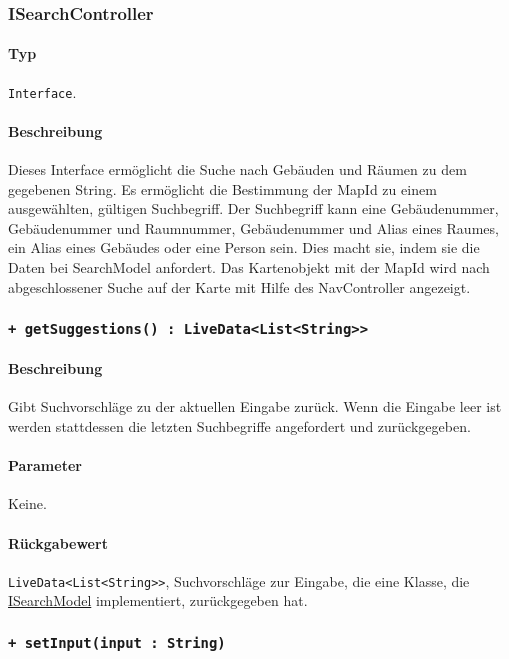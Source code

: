 \subsubsection{ISearchController}\label{App_Search_ISearchController}
\paragraph*{Typ}
\texttt{Interface}.
\paragraph*{Beschreibung}
Dieses Interface ermöglicht die Suche nach Gebäuden und Räumen zu dem gegebenen String. 
Es ermöglicht die Bestimmung der MapId zu einem ausgewählten, gültigen Suchbegriff. 
Der Suchbegriff kann eine Gebäudenummer, Gebäudenummer und Raumnummer, Gebäudenummer und Alias eines Raumes, ein Alias eines Gebäudes oder eine Person sein.
Dies macht sie, indem sie die Daten bei SearchModel anfordert.
Das Kartenobjekt mit der MapId wird nach abgeschlossener Suche auf der Karte mit Hilfe des NavController angezeigt.


\subsubsection*{\texttt{+ getSuggestions() : LiveData<List<String>>}}\label{App_Search_ISearchController_getSuggestions}%
\paragraph*{Beschreibung}
Gibt Suchvorschläge zu der aktuellen Eingabe zurück.
Wenn die Eingabe leer ist werden stattdessen die letzten Suchbegriffe angefordert und zurückgegeben.
\paragraph*{Parameter}
Keine.
\paragraph*{Rückgabewert}
\texttt{LiveData<List<String>>}, Suchvorschläge zur Eingabe, die eine Klasse, die \hyperref[App_Search_ISearchModel]{ISearchModel} implementiert, zurückgegeben hat.

\subsubsection*{\texttt{+ setInput(input : String)}}\label{App_Search_ISearchController_setInput}%
